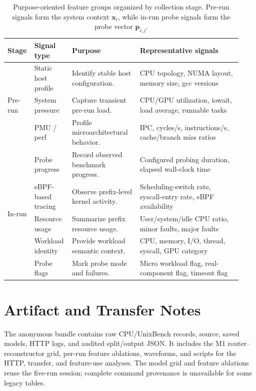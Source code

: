 \documentclass[sigconf, review, anonymous, balance=false]{acmart}
\begin{document}
\begin{table}[t]
\centering
\caption{Purpose-oriented feature groups organized by collection stage. Pre-run signals form the system context \(\mathbf{x}_i\), while in-run probe signals form the probe vector \(\mathbf{p}_{i,j}\).}
\label{tab:feature_collection}
\small
\setlength{\tabcolsep}{5pt}
\renewcommand{\arraystretch}{1.10}
\begin{tabular}{p{0.07\linewidth}| p{0.15\linewidth} p{0.29\linewidth} p{0.42\linewidth}}
\toprule
\textbf{Stage} & \textbf{Signal type} & \textbf{Purpose} & \textbf{Representative signals} \\
\midrule

\multirow{3}{=}{Pre-run}
& Static host profile
& Identify stable host configuration.
& CPU topology, NUMA layout, memory size, gcc versions \\

& System pressure
& Capture transient pre-run load.
& CPU/GPU utilization, iowait, load average, runnable tasks \\

& PMU / perf
& Profile microarchitectural behavior.
& IPC, cycles/s, instructions/s, cache/branch miss ratios \\

\midrule

\multirow{5}{=}{In-run}
& Probe progress
& Record observed benchmark progress.
& Configured probing duration, elapsed wall-clock time \\

& eBPF-based tracing
& Observe prefix-level kernel activity.
& Scheduling-switch rate, syscall-entry rate, eBPF availability \\

& Resource usage
& Summarize prefix resource usage.
& User/system/idle CPU ratio, minor faults, major faults \\

& Workload identity
& Provide workload semantic context.
& CPU, memory, I/O, thread, syscall, GPU category \\

& Probe flags
& Mark probe mode and failures.
& Micro workload flag, real-component flag, timeout flag \\

\bottomrule
\end{tabular}
\end{table}

\section{Artifact and Transfer Notes}
\label{app:artifact-notes}
The anonymous bundle contains raw CPU/UnixBench records, source, saved models, HTTP logs, and audited split/output JSON. It includes the M1 router--reconstructor grid, per-run feature ablations, waveforms, and scripts for the HTTP, transfer, and feature-use analyses. The model grid and feature ablations reuse the five-run session; complete command provenance is unavailable for some legacy tables.
\end{document}
